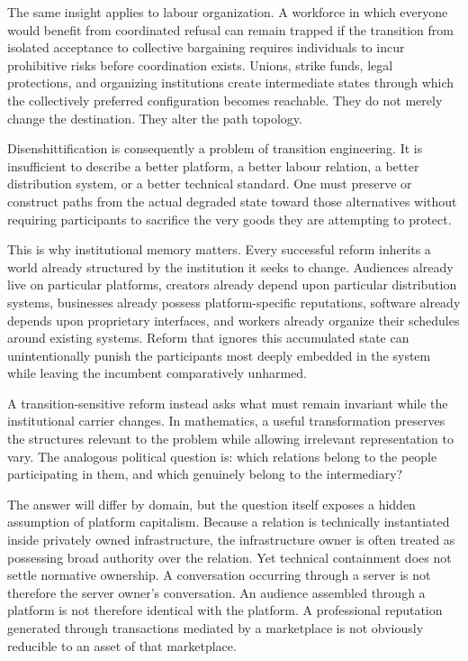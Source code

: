 \documentclass[11pt]{article}
\begin{document}
The same insight applies to labour organization. A workforce in which everyone would benefit from coordinated refusal can remain trapped if the transition from isolated acceptance to collective bargaining requires individuals to incur prohibitive risks before coordination exists. Unions, strike funds, legal protections, and organizing institutions create intermediate states through which the collectively preferred configuration becomes reachable. They do not merely change the destination. They alter the path topology.

Disenshittification is consequently a problem of transition engineering. It is insufficient to describe a better platform, a better labour relation, a better distribution system, or a better technical standard. One must preserve or construct paths from the actual degraded state toward those alternatives without requiring participants to sacrifice the very goods they are attempting to protect.

This is why institutional memory matters. Every successful reform inherits a world already structured by the institution it seeks to change. Audiences already live on particular platforms, creators already depend upon particular distribution systems, businesses already possess platform-specific reputations, software already depends upon proprietary interfaces, and workers already organize their schedules around existing systems. Reform that ignores this accumulated state can unintentionally punish the participants most deeply embedded in the system while leaving the incumbent comparatively unharmed.

A transition-sensitive reform instead asks what must remain invariant while the institutional carrier changes. In mathematics, a useful transformation preserves the structures relevant to the problem while allowing irrelevant representation to vary. The analogous political question is: which relations belong to the people participating in them, and which genuinely belong to the intermediary?

The answer will differ by domain, but the question itself exposes a hidden assumption of platform capitalism. Because a relation is technically instantiated inside privately owned infrastructure, the infrastructure owner is often treated as possessing broad authority over the relation. Yet technical containment does not settle normative ownership. A conversation occurring through a server is not therefore the server owner's conversation. An audience assembled through a platform is not therefore identical with the platform. A professional reputation generated through transactions mediated by a marketplace is not obviously reducible to an asset of that marketplace.
\end{document}
